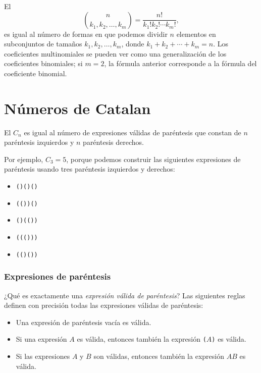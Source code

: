 
El 
\[ {n \choose k_1,k_2,\ldots,k_m} = \frac{n!}{k_1! k_2! \cdots k_m!}, \]
es igual al número de formas
en que podemos dividir $n$ elementos en subconjuntos
de tamaños $k_1,k_2,\ldots,k_m$,
donde $k_1+k_2+\cdots+k_m=n$.
Los coeficientes multinomiales se pueden ver como una
generalización de los coeficientes binomiales;
si $m=2$, la fórmula anterior
corresponde a la fórmula del coeficiente binomial.

\section{Números de Catalan}


El 
$C_n$ es igual al
número de expresiones válidas de paréntesis que constan de
$n$ paréntesis izquierdos y $n$ paréntesis derechos.

Por ejemplo, $C_3=5$, porque
podemos construir las siguientes expresiones de
paréntesis usando tres
paréntesis izquierdos y derechos:

\begin{itemize}[noitemsep]
\item \texttt{()()()}
\item \texttt{(())()}
\item \texttt{()(())}
\item \texttt{((()))}
\item \texttt{(()())}
\end{itemize}

\subsubsection{Expresiones de paréntesis}


¿Qué es exactamente una \emph{expresión válida de paréntesis}?
Las siguientes reglas definen con precisión todas
las expresiones válidas de paréntesis:

\begin{itemize}
\item Una expresión de paréntesis vacía es válida.
\item Si una expresión $A$ es válida,
entonces también la expresión
\texttt{(}$A$\texttt{)} es válida.
\item Si las expresiones $A$ y $B$ son válidas,
entonces también la expresión $AB$ es válida.
\end{itemize}

